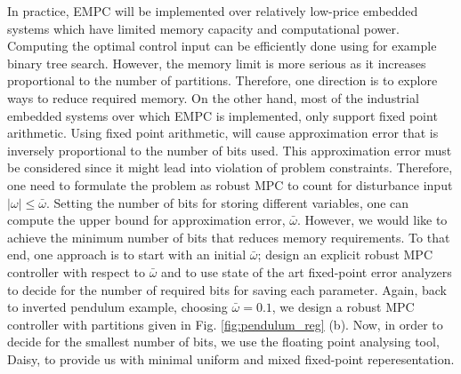 	In practice, EMPC will be implemented over relatively low-price embedded systems which have limited memory capacity and computational power. Computing the optimal control input can be efficiently done using for example binary tree search. However, the memory limit is more serious as it increases proportional to the number of partitions.	Therefore, one direction is to explore ways to reduce required memory.
	On the other hand, most of the industrial embedded systems over which EMPC is implemented, only support fixed point arithmetic. Using fixed point arithmetic, will cause approximation error that is inversely proportional to the number of bits used. This approximation error must be considered since it might lead into violation of problem constraints. Therefore, one need to formulate the problem as robust MPC to count for disturbance input $|\omega|\leq \bar\omega$. Setting the number of bits for storing different variables, one can compute the upper bound for approximation error, $\bar\omega$. However, we would like to achieve the minimum number of bits that reduces memory requirements. To that end, one approach is to start with an initial $\bar \omega$; design an explicit robust MPC controller with respect to $\bar \omega$ and to use state of the art fixed-point error analyzers to decide for the number of required bits for saving each parameter. Again, back to inverted pendulum example, choosing $\bar \omega=0.1$, we design a robust MPC controller with partitions given in Fig. \ref{fig:pendulum_reg} (b). Now, in order to decide for the smallest number of bits, we use the floating point analysing tool, Daisy, to provide us with minimal uniform and mixed fixed-point reperesentation. 
	
	
